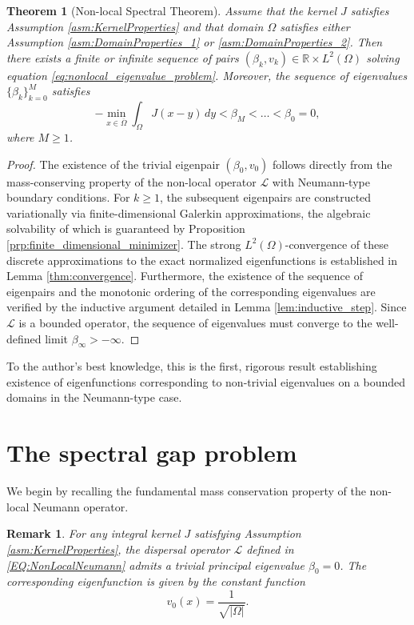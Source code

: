 \documentclass[11pt, a4paper]{article}
\theoremstyle{break}
\newtheorem{thm}{Theorem}[section]
\theoremstyle{break}
\theoremstyle{break}
\theoremstyle{break}
\newtheorem{rem}{Remark}[section]
\theoremstyle{break}
\theoremstyle{break}
\theoremstyle{break}
\theoremstyle{break}
\theoremstyle{break}
\begin{document}
\begin{thm}[Non-local Spectral Theorem]
\label{thm:spectral_theorem}
Assume that the kernel $J$ satisfies Assumption \ref{asm:KernelProperties} and that domain $\Omega$ satisfies either Assumption \ref{asm:DomainProperties_1} or \ref{asm:DomainProperties_2}. Then there exists a finite or infinite sequence of pairs $(\beta_k, v_k) \in \mathbb{R} \times L^2(\Omega)$ solving equation \eqref{eq:nonlocal_eigenvalue_problem}. Moreover, the sequence of eigenvalues $\{\beta_k\}_{k = 0}^M$ satisfies
\begin{equation}
    -\min_{x \in \overline{\Omega}} \int_\Omega J(x-y) \, dy < \beta_M < \ldots < \beta_0 = 0,
\end{equation}
where $M \geq 1$.
\end{thm}

\begin{proof}
The existence of the trivial eigenpair $(\beta_0, v_0)$ follows directly from the mass-conserving property of the non-local operator $\mathcal{L}$ with Neumann-type boundary conditions. For $k \ge 1$, the subsequent eigenpairs are constructed variationally via finite-dimensional Galerkin approximations, the algebraic solvability of which is guaranteed by Proposition \ref{prp:finite_dimensional_minimizer}. The strong $L^2(\Omega)$-convergence of these discrete approximations to the exact normalized eigenfunctions is established in Lemma \ref{thm:convergence}. Furthermore, the existence of the sequence of eigenpairs and the monotonic ordering of the corresponding eigenvalues are verified by the inductive argument detailed in Lemma \ref{lem:inductive_step}. Since $\mathcal{L}$ is a bounded operator, the sequence of eigenvalues must converge to the well-defined limit $\beta_\infty > -\infty$.
\end{proof}

To the author's best knowledge, this is the first, rigorous result establishing existence of eigenfunctions corresponding to non-trivial eigenvalues on a bounded domains in the Neumann-type case.

\section{The spectral gap problem}

We begin by recalling the fundamental mass conservation property of the non-local Neumann operator.

\begin{rem}
    For any integral kernel $J$ satisfying Assumption \ref{asm:KernelProperties}, the dispersal operator $\mathcal{L}$ defined in \eqref{EQ:NonLocalNeumann} admits a trivial principal eigenvalue $\beta_0 = 0$. The corresponding eigenfunction is given by the constant function 
    \begin{equation}
        v_0(x) = \frac{1}{\sqrt{|\Omega|}}.
    \end{equation}
\end{rem}
\end{document}

